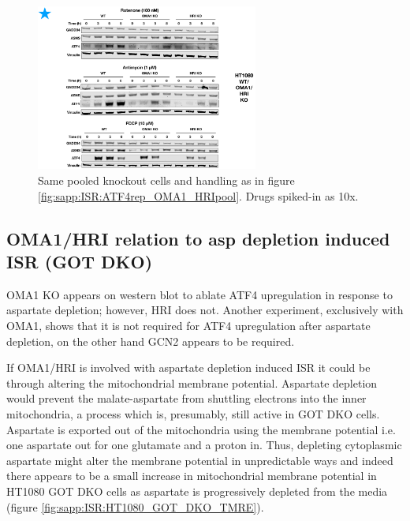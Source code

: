 \begin{figure}[t]
    \centering
    \includegraphics[width=0.65\textwidth]{figures/sapp/ISR/ATF4wes_OMA1_HRIpool.pdf}
    \caption[ATF4 post mito inhib. OMA1/HRI KO, western.]{
    Same pooled knockout cells and handling as in figure \ref{fig:sapp:ISR:ATF4rep_OMA1_HRIpool}.
    Drugs spiked-in as 10x.
    }
    \label{fig:sapp:ISR:ATF4wes_OMA1_HRIpool}
\end{figure}






\FloatBarrier
\subsection{OMA1/HRI relation to asp depletion induced ISR (GOT DKO)}
OMA1 KO appears on western blot to ablate ATF4 upregulation in response to aspartate depletion; however, HRI does not.
Another experiment, exclusively with OMA1, shows that it is not required for ATF4 upregulation after aspartate depletion, on the other hand GCN2 appears to be required.

If OMA1/HRI is involved with aspartate depletion induced ISR it could be through altering the mitochondrial membrane potential.
Aspartate depletion would prevent the malate-aspartate from shuttling electrons into the inner mitochondria, a process which is, presumably, still active in GOT DKO cells.
Aspartate is exported out of the mitochondria using the membrane potential i.e. one aspartate out for one glutamate and a proton in.
Thus, depleting cytoplasmic aspartate might alter the membrane potential in unpredictable ways and indeed there appears to be a small increase in mitochondrial membrane potential in HT1080 GOT DKO cells as aspartate is progressively depleted from the media (figure \ref{fig:sapp:ISR:HT1080_GOT_DKO_TMRE}).

